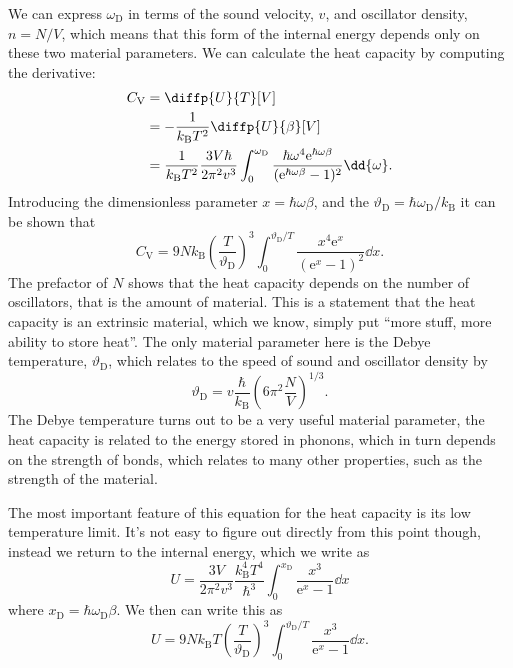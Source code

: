 \documentclass[fleqn]{NotesClass}
\newcommand*{\boltzmann}{k_{\mathrm{B}}}
\newcommand*{\e}{\mathrm{e}}
\newcommand*{\heatCapacityVolume}{C_{\mathrm{V}}}
\newcommand*{\debye}{\mathrm{D}}
\begin{document}
    We can express \(\omega_{\debye}\) in terms of the sound velocity, \(v\), and oscillator density, \(n = N/V\), which means that this form of the internal energy depends only on these two material parameters.
    We can calculate the heat capacity by computing the derivative:
    \begin{align}
        \heatCapacityVolume &= \diffp{U}{T}[V]\\
        &= -\frac{1}{\boltzmann T^2} \diffp{U}{\beta}[V]\\
        &= \frac{1}{\boltzmann T^2}\frac{3V\hbar}{2\pi^2v^3} \int_{0}^{\omega_{\debye}} \frac{\hbar\omega^4\e^{\hbar\omega\beta}}{(\e^{\hbar\omega\beta} - 1)^2} \dd{\omega}.
    \end{align}
    Introducing the dimensionless parameter \(x = \hbar\omega\beta\), and the  \(\vartheta_{\debye} = \hbar\omega_{\debye}/\boltzmann\) it can be shown that
    \begin{equation}
        \heatCapacityVolume = 9N\boltzmann \left( \frac{T}{\vartheta_{\debye}} \right)^{3} \int_{0}^{\vartheta_{\debye}/T} \frac{x^4\e^{x}}{(\e^{x} - 1)^2} \dd{x}.
    \end{equation}
    The prefactor of \(N\) shows that the heat capacity depends on the number of oscillators, that is the amount of material.
    This is a statement that the heat capacity is an extrinsic material, which we know, simply put \enquote{more stuff, more ability to store heat}.
    The only material parameter here is the Debye temperature, \(\vartheta_{\debye}\), which relates to the speed of sound and oscillator density by
    \begin{equation}
        \vartheta_{\debye} = v\frac{\hbar}{\boltzmann} \left( 6\pi^2 \frac{N}{V} \right)^{1/3}.
    \end{equation}
    The Debye temperature turns out to be a very useful material parameter, the heat capacity is related to the energy stored in phonons, which in turn depends on the strength of bonds, which relates to many other properties, such as the strength of the material.
    
    The most important feature of this equation for the heat capacity is its low temperature limit.
    It's not easy to figure out directly from this point though, instead we return to the internal energy, which we write as
    \begin{equation}
        U = \frac{3V}{2\pi^2v^3} \frac{\boltzmann^4T^4}{\hbar^3} \int_0^{x_{\debye}} \frac{x^3}{\e^x - 1} \dd{x}
    \end{equation}
    where \(x_{\debye} = \hbar\omega_{\debye}\beta\).
    We then can write this as
    \begin{equation}
        U = 9N\boltzmann T \left( \frac{T}{\vartheta_{\debye}} \right)^{3} \int_{0}^{\vartheta_{\debye}/T} \frac{x^3}{\e^x - 1} \dd{x}.
    \end{equation}
    
\end{document}
